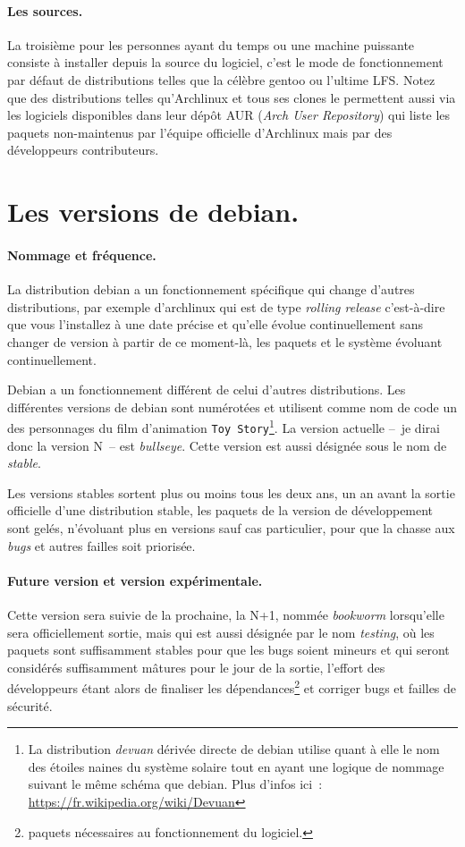 \documentclass[12pt, a4paper]{report}
\begin{document}
\paragraph{Les sources.}
La troisième pour les personnes ayant du temps ou une machine puissante consiste à installer depuis la source du logiciel, c'est le mode de fonctionnement par défaut de distributions telles que la célèbre gentoo ou l'ultime LFS. Notez que des distributions telles qu'Archlinux et tous ses clones le permettent aussi via les logiciels disponibles dans leur dépôt AUR (\emph{Arch User Repository\/}) qui liste les paquets non-maintenus par l'équipe officielle d'Archlinux mais par des développeurs contributeurs.

\section{Les versions de debian.}
\paragraph{Nommage et fréquence.}
La distribution debian a un fonctionnement spécifique qui change d'autres distributions, par exemple d'archlinux qui est de type \emph{rolling release\/} c'est-à-dire que vous l'installez à une date précise et qu'elle évolue continuellement sans changer de version à partir de ce moment-là, les paquets et le système évoluant continuellement.

Debian a un fonctionnement différent de celui d'autres distributions. 
Les différentes versions de debian sont numérotées et utilisent comme nom de code un des personnages du film d'animation \texttt{Toy Story\/}\footnote{La distribution \emph{devuan\/} dérivée directe de debian utilise quant à elle le nom des étoiles naines du système solaire tout en ayant une logique de nommage suivant le même schéma que debian.\newline
Plus d'infos ici~: \url{https://fr.wikipedia.org/wiki/Devuan}}. 
La version actuelle --~je dirai donc la version N~-- est \emph{bullseye\/}. 
Cette version est aussi désignée sous le nom de \emph{stable\/}.

Les versions stables sortent plus ou moins tous les deux ans, un an avant la sortie officielle d'une distribution stable, les paquets de la version de développement sont gelés, n'évoluant plus en versions sauf cas particulier, pour que la chasse aux \emph{bugs\/} et autres failles soit priorisée.

\paragraph{Future version et version expérimentale.}
Cette version sera suivie de la prochaine, la N+1, nommée \emph{bookworm\/} lorsqu'elle sera officiellement sortie, mais qui est aussi désignée par le nom \emph{testing\/}, où les paquets sont suffisamment stables pour que les bugs soient mineurs et qui seront considérés suffisamment mâtures pour le jour de la sortie, l'effort des développeurs étant alors de finaliser les dépendances\footnote{paquets nécessaires au fonctionnement du logiciel.} et corriger bugs et failles de sécurité.
\end{document}
